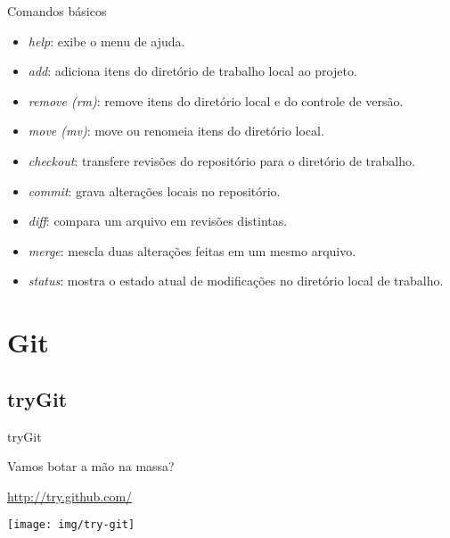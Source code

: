 \documentclass[a4paper]{beamer}
\begin{document}
\begin{frame}{Comandos básicos}
\begin{itemize}[<+->]

\item \textit{help}: exibe o menu de ajuda.

\item \textit{add}: adiciona itens do diretório de trabalho local ao projeto.

\item \textit{remove (rm)}: remove itens do diretório local e do controle de versão.

\item \textit{move (mv)}: move ou renomeia itens do diretório local.

\item \textit{checkout}: transfere revisões do repositório para o diretório de trabalho.

\item \textit{commit}: grava alterações locais no repositório.

\item \textit{diff}: compara um arquivo em revisões distintas.

\item \textit{merge}: mescla duas alterações feitas em um mesmo arquivo.

\item \textit{status}: mostra o estado atual de modificações no diretório local de trabalho.

\end{itemize}
\end{frame}

\section{Git}

\subsection{tryGit}

\begin{frame}{tryGit}

Vamos botar a mão na massa?
\begin{center}
\url{http://try.github.com/}
\end{center}

\begin{center}
\texttt{[image: img/try-git]}
\end{center}

\end{frame}
\end{document}
